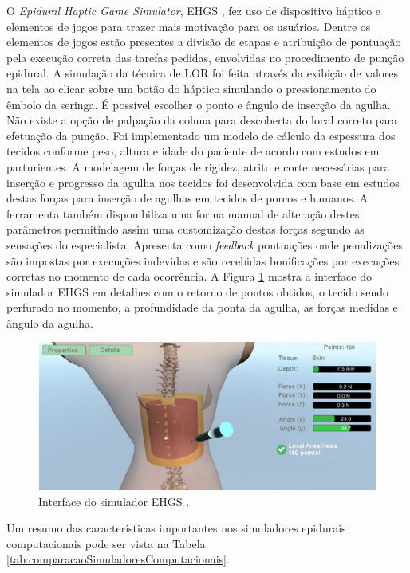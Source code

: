 O \textit{Epidural Haptic Game Simulator}, EHGS \cite{Brazil2017}, fez uso de dispositivo háptico e elementos de jogos para trazer mais motivação para os usuários. Dentre os elementos de jogos estão presentes a divisão de etapas e atribuição de pontuação pela execução correta das tarefas pedidas, envolvidas no procedimento de punção epidural. A simulação da técnica de LOR foi feita através da exibição de valores na tela ao clicar sobre um botão do háptico simulando o pressionamento do êmbolo da seringa. É possível escolher o ponto e ângulo de inserção da agulha. Não existe a opção de palpação da coluna para descoberta do local correto para efetuação da punção. Foi implementado um modelo de cálculo da espessura dos tecidos conforme peso, altura e idade do paciente de acordo com estudos em parturientes. A modelagem de forças de rigidez, atrito e corte necessárias para inserção e progresso da agulha nos tecidos foi desenvolvida com base em estudos destas forças para inserção de agulhas em tecidos de porcos e humanos. A ferramenta também disponibiliza uma forma manual de alteração destes parâmetros permitindo assim uma customização destas forças segundo as sensações do especialista. Apresenta como \textit{feedback} pontuações onde penalizações são impostas por execuções indevidas e são recebidas bonificações por execuções corretas no momento de cada ocorrência. A Figura \ref{fig:brasilSimulator} mostra a interface do simulador EHGS em detalhes com o retorno de pontos obtidos, o tecido sendo perfurado no momento, a profundidade da ponta da agulha, as forças medidas e ângulo da agulha.

\begin{figure}[ht!]
    \centering
    \includegraphics[width=0.8\linewidth]{capitulos/figuras/brasilSimulator.png} 
    \caption{Interface do simulador EHGS \cite{Brazil2017}.}
    \label{fig:brasilSimulator}
\end{figure}

Um resumo das características importantes nos simuladores epidurais computacionais pode ser vista na Tabela \ref{tab:comparacaoSimuladoresComputacionais}.

